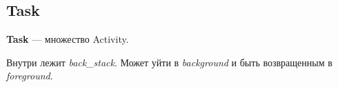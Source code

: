 \subsection{Task}
\textbf{Task} --- множество Activity.  

Внутри лежит \textit{back\_stack}. Может уйти в \textit{background} и быть возвращенным в \textit{foreground}. 